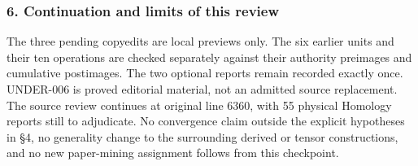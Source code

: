 \subsubsection{6. Continuation and limits of this review}\label{continuation-and-limits-of-this-review}

The three pending copyedits are local previews only. The six earlier units and their ten operations are checked separately against their authority preimages and cumulative postimages. The two optional reports remain recorded exactly once. UNDER-006 is proved editorial material, not an admitted source replacement. The source review continues at original line 6360, with 55 physical Homology reports still to adjudicate. No convergence claim outside the explicit hypotheses in §4, no generality change to the surrounding derived or tensor constructions, and no new paper-mining assignment follows from this checkpoint.
